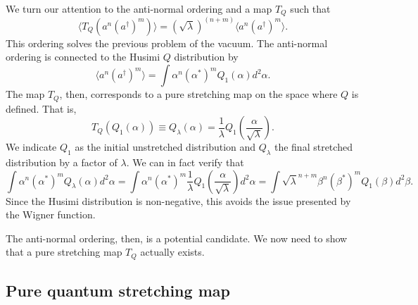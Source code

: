\documentclass{article}
\begin{document}
We turn our attention to the anti-normal ordering and a map $T_Q$ such that
\begin{equation}
\langle T_Q(a^n(a^\dagger)^m) \rangle = (\sqrt{\lambda})^{(n+m)} \langle a^n(a^\dagger)^m \rangle.
\end{equation}
This ordering solves the previous problem of the vacuum. The anti-normal ordering is connected to the Husimi $Q$ distribution by
\begin{equation}
    \langle a^n (a^\dagger)^m\rangle=\int \alpha^n(\alpha^*)^m Q_1(\alpha)d^2\alpha.
\end{equation}
The map $T_Q$, then, corresponds to a pure stretching map on the space where $Q$ is defined. That is,
\begin{equation}
T_Q(Q_1(\alpha)) \equiv Q_\lambda(\alpha) = \frac{1}{\lambda}Q_1\left(\frac{\alpha}{\sqrt{\lambda}}\right).
\end{equation}
We indicate $Q_1$ as the initial unstretched distribution and $Q_\lambda$ the final stretched distribution by a factor of $\lambda$. We can in fact verify that 
\begin{equation}
\int \alpha^n(\alpha^*)^m Q_\lambda(\alpha)d^2\alpha=\int \alpha^n(\alpha^*)^m \frac{1}{\lambda}Q_1\left(\frac{\alpha}{\sqrt{\lambda}}\right)d^2\alpha=\int \sqrt{\lambda}^{n+m}\beta^n(\beta^*)^m Q_1(\beta)d^2\beta.
\end{equation}
Since the Husimi distribution is non-negative, this avoids the issue presented by the Wigner function.

The anti-normal ordering, then, is a potential candidate. We now need to show that a pure stretching map $T_Q$ actually exists.

\subsection{Pure quantum stretching map}
\end{document}
